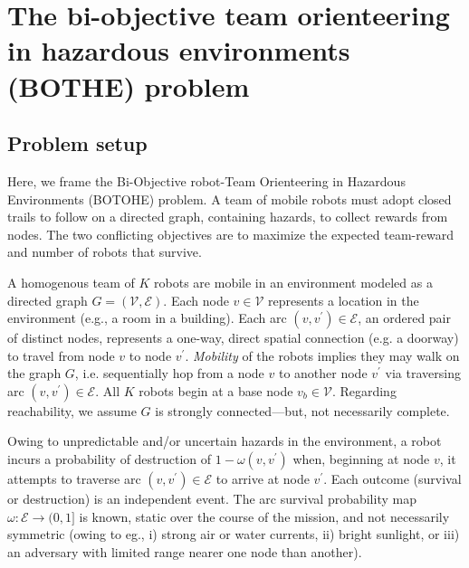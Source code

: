 \documentclass[11pt, oneside]{article}
\begin{document}
\section{The bi-objective team orienteering in hazardous environments (BOTHE) problem}




\subsection{Problem setup}
Here, we frame the Bi-Objective robot-Team Orienteering in Hazardous Environments (BOTOHE) problem. A team of mobile robots must adopt closed trails to follow on a directed graph, containing hazards, to collect rewards from nodes. The two conflicting objectives are to maximize the expected team-reward and number of robots that survive.


A homogenous team of $K$ robots are mobile in an environment modeled as a directed graph $G=(\mathcal{V}, \mathcal{E})$. Each node $v \in \mathcal{V}$ represents a location in the environment (e.g., a room in a building). Each arc $(v, v^\prime) \in\mathcal{E}$, an ordered pair of distinct nodes, represents a one-way, direct spatial connection (e.g. a doorway) to travel from node $v$ to node $v^\prime$. 
\emph{Mobility} of the robots implies they may walk on the graph $G$, i.e. sequentially hop from a node $v$ to another node $v^\prime$ via traversing arc $(v, v^\prime)\in\mathcal{E}$.
All $K$ robots begin at a base node $v_b \in \mathcal{V}$. 
Regarding reachability, we assume $G$ is strongly connected---but, not necessarily complete. 

Owing to unpredictable and/or uncertain hazards in the environment, a robot incurs a probability of destruction of $1 - \omega(v, v^\prime)$ when, beginning at node $v$, it attempts to traverse arc $(v, v^\prime) \in \mathcal{E}$ to arrive at node $v^\prime$.
Each outcome (survival or destruction) is an independent event. 
The arc survival probability map $\omega: \mathcal{E} \rightarrow (0, 1]$ is known, static over the course of the mission, and not necessarily symmetric (owing to eg., i) strong air or water currents, ii) bright sunlight, or iii) an adversary with limited range nearer one node than another).
\end{document}
